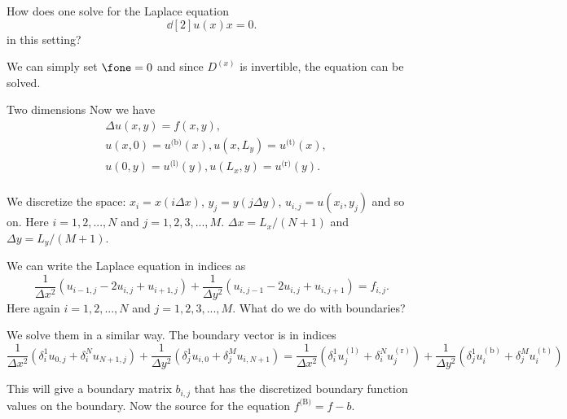 \begin{frame}
	How does one solve for the Laplace equation 
	\[ \dd[2]{u(x)}{x} = 0. \]
	in this setting?
	
	\pause
	We can simply set $ \fone = 0 $ and since $ D^{(x)}  $ is invertible, the equation can be solved.
\end{frame}

\begin{frame}{Two dimensions}
	Now we have 
	\[ \begin{split}
	&\Delta u(x,y) = f(x,y), \\
	&u(x,0) = u^\text{(b)}(x), u(x,L_y) = u^\text{(t)}(x), \\
	&u(0,y) = u^\text{(l)}(y), u(L_x,y) = u^\text{(r)}(y). \\
	\end{split}
	\]
	
	\pause
	We discretize the space: $ x_i = x(i \Delta x) $, $ y_j = y(j\Delta y) $, $ u_{i,j} = u(x_i,y_j) $ and so on. Here $ i=1,2,...,N $ and $ j=1,2,3,...,M $. 
	$ \Delta x = L_x/(N+1) $ and $ \Delta y = L_y/(M+1) $. 
\end{frame}

\begin{frame}
	We can write the Laplace equation in indices as 
	\[ \frac{1}{\Delta x^2}(u_{i-1,j} - 2 u_{i,j} + u_{i+1,j})  
	+ \frac{1}{\Delta y^2}(u_{i,j-1} - 2 u_{i,j} + u_{i,j+1}) = f_{i,j}.
	\]
	Here again $ i = 1,2,...,N $ and $ j = 1,2,3,...,M $. What do we do with boundaries?
	
	\pause
	We solve them in a similar way. The boundary vector is in indices
	\[ \frac{1}{\Delta x^2}(\delta_i^1 u_{0,j} + \delta_i^N u_{N+1,j} ) 
	+ \frac{1}{\Delta y^2}(\delta_j^1 u_{i,0} + \delta_j^M u_{i,N+1} )
	= \frac{1}{\Delta x^2}(\delta_i^1 u_{j}^{(\text{l})} + \delta_i^N u_{j}^{(\text{r})} ) 
	+ \frac{1}{\Delta y^2}(\delta_j^1 u_{i}^{(\text{b})} + \delta_j^M u_{i}^{(\text{t})} )
	\]
	
	\pause
	This will give a boundary matrix $ b_{i,j} $ that has the discretized boundary function values on the boundary. Now the source for the equation $ f^\text{(B)} = f - b $.
\end{frame}

